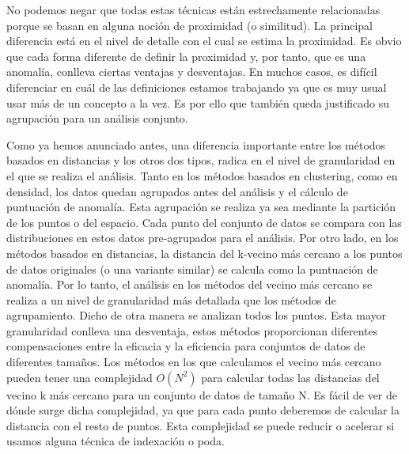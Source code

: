 No podemos negar que todas estas técnicas están estrechamente 
relacionadas porque se basan en alguna noción de proximidad (o similitud).
La principal diferencia está en el nivel de detalle con el cual se 
estima la proximidad. Es obvio que cada forma diferente de definir la 
proximidad y, por tanto, que es una anomalía, conlleva ciertas ventajas
y desventajas. En muchos casos, es difícil diferenciar en cuál de las
definiciones estamos trabajando ya que es muy usual usar más de un concepto
a la vez. Es por ello que también queda justificado su agrupación para un análisis conjunto.

Como ya hemos anunciado antes, una diferencia importante entre los 
métodos basados en distancias y los otros dos tipos, radica en el
nivel de granularidad en el que se realiza el análisis. Tanto en los 
métodos basados en clustering, como en densidad, los datos quedan 
agrupados antes del análisis y el cálculo de puntuación de anomalía.
Esta agrupación se realiza ya sea mediante la partición de los puntos
o del espacio. Cada punto del conjunto de datos se compara con las 
distribuciones en estos datos pre-agrupados para el análisis. Por
otro lado, en los métodos basados en distancias, la distancia del
k-vecino más cercano a los puntos de datos originales (o una variante 
similar) se calcula como la puntuación de anomalía. Por lo tanto, el 
análisis en los métodos del vecino más cercano se realiza a un nivel de 
granularidad más detallada que los métodos de agrupamiento. Dicho de otra manera
se analizan todos los puntos. Esta mayor granularidad conlleva una desventaja,
estos métodos proporcionan diferentes compensaciones entre la eficacia y la 
eficiencia para conjuntos de datos de diferentes tamaños. Los métodos en los
que calculamos el vecino más cercano pueden tener una complejidad $O(N^{2})$ para
calcular todas las distancias del vecino k más cercano para un conjunto de
datos de tamaño N. Es fácil de ver de dónde surge dicha
complejidad, ya que para cada punto deberemos de calcular la distancia con
el resto de puntos. Esta complejidad se puede reducir o acelerar si 
usamos alguna técnica de indexación o poda.

